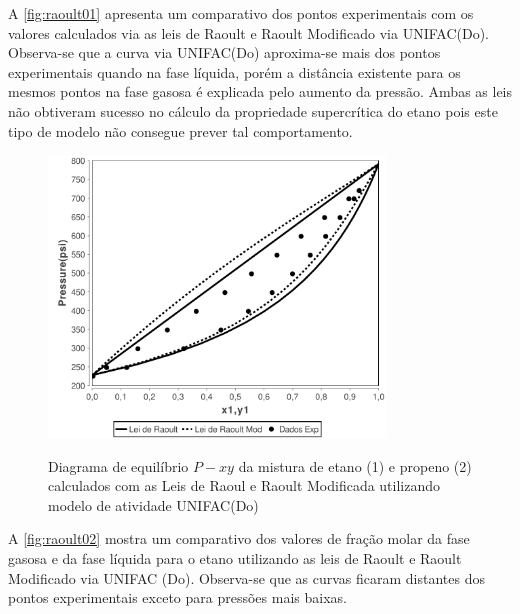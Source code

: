 A \autoref{fig:raoult01} apresenta um comparativo dos pontos experimentais com
os valores calculados via as leis de Raoult e Raoult Modificado via UNIFAC(Do).
Observa-se que a curva via UNIFAC(Do) aproxima-se mais dos pontos experimentais
quando na fase líquida, porém a distância existente para os mesmos pontos na
fase gasosa é explicada pelo aumento da pressão. Ambas as leis não obtiveram
sucesso no cálculo da propriedade supercrítica do etano pois este tipo de
modelo não consegue prever tal comportamento.

\begin{figure}[htb]
\centering
{\includegraphics[width=0.8\textwidth]{img/VLE-Ethane(1)Propylene(2)-x1y1&Pressure-Raoult-RaoultMod.pdf}}
\caption{Diagrama de equilíbrio $P-xy$ da mistura de etano (1) e
propeno (2) calculados com as Leis de Raoul e Raoult Modificada utilizando
modelo de atividade UNIFAC(Do)}
\label{fig:raoult01}
\end{figure}

A \autoref{fig:raoult02} mostra um comparativo dos valores de fração molar da
fase gasosa e da fase líquida para o etano utilizando as leis de Raoult e Raoult
Modificado via UNIFAC (Do). Observa-se que as curvas ficaram distantes dos
pontos experimentais exceto para pressões mais baixas.

